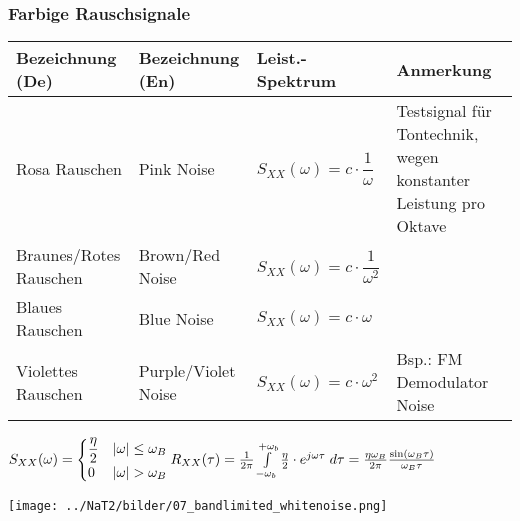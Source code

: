 \subsubsection{Farbige Rauschsignale}
\renewcommand{\arraystretch}{2}
\begin{tabular}[c]{ | p{4cm} | p{3.5cm} | p{3cm} | p{6cm} | }
	\hline
		\textbf{Bezeichnung (De)}
		& \textbf{Bezeichnung (En)}
		& \textbf{Leist.-Spektrum}
		& \textbf{Anmerkung} \\
	\hline
		Rosa Rauschen
		& Pink Noise
		& $S_{XX}(\omega) = c \cdot \dfrac{1}{\omega}$
		& Testsignal für Tontechnik, wegen konstanter Leistung pro Oktave \\
	\hline
		Braunes/Rotes Rauschen
		& Brown/Red Noise
		&	$S_{XX}(\omega) = c \cdot \dfrac{1}{\omega^2}$
		& \\
	\hline
		Blaues Rauschen
		& Blue Noise
		&	$S_{XX}(\omega) = c \cdot \omega$
		& \\
	\hline
		Violettes Rauschen
		& Purple/Violet Noise
		&	$S_{XX}(\omega) = c \cdot \omega^2$
		& Bsp.: FM Demodulator Noise\\
    \hline
\end{tabular}
\renewcommand{\arraystretch}{1}

\begin{center}
	\begin{minipage}{8cm}
		$S_{XX}(\omega) = \begin{cases}
                      \dfrac{\eta}{2} & |\omega| \leq \omega_B \\
                      0 & |\omega| > \omega_B
                      \end{cases} \\ \\
		R_{XX}(\tau) =  \frac{1}{2\pi} \int\limits_{-\omega_{b}}^{+\omega_{b}}
                                           \frac{\eta}{2}  \cdot e^{j\omega\tau}\; d\tau
                      = \frac{\eta\omega_{B}}{2\pi} \frac{\sin(\omega_{B}\tau)}{\omega_{B}\tau}$
  	\end{minipage}
	\begin{minipage}{10cm}
		\texttt{[image: ../NaT2/bilder/07\_bandlimited\_whitenoise.png]}
  	\end{minipage}
\end{center}

